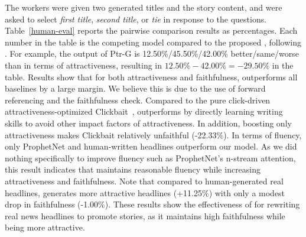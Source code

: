 The workers were given two generated titles and the story content, and were asked
to select \textit{first title}, \textit{second title}, or \textit{tie} in
response to the questions. %
Table~\ref{human-eval} reports the pairwise comparison results as percentages.
Each number in the table is the competing model compared to the proposed
\modelname, following \citet{zhao-etal-2020-bridging}. For
example, the output of Ptr-G is 12.50\%/45.50\%/42.00\%
better/same/worse than \modelname in terms of attractiveness, resulting in
$12.50\%-42.00\% = -29.50\%$ in the table. Results show that for both
attractiveness and faithfulness, \modelname
outperforms all baselines by a large margin. We believe this is due to
the use of forward referencing and the faithfulness check. 
Compared to the pure click-driven attractiveness-optimized 
Clickbait~\cite{xu-etal-2019-clickbait}, \modelname outperforms by directly learning 
writing skills to avoid other impact factors of attractiveness.
In addition, boosting only attractiveness makes Clickbait relatively
unfaithful (-22.33\%). 
In terms of fluency, only ProphetNet and human-written headlines outperform our
model. As we did nothing specifically to improve fluency such as ProphetNet's n-stream
attention, this result indicates that \modelname maintains
reasonable fluency while increasing attractiveness and faithfulness. 
Note that compared to human-generated real headlines, \modelname generates
more attractive headlines (+11.25\%) with only a modest drop in faithfulness
(-1.00\%). 
These results show the effectiveness of \modelname for rewriting real news
headlines to promote stories, as it maintains high faithfulness while being
more attractive.
 
